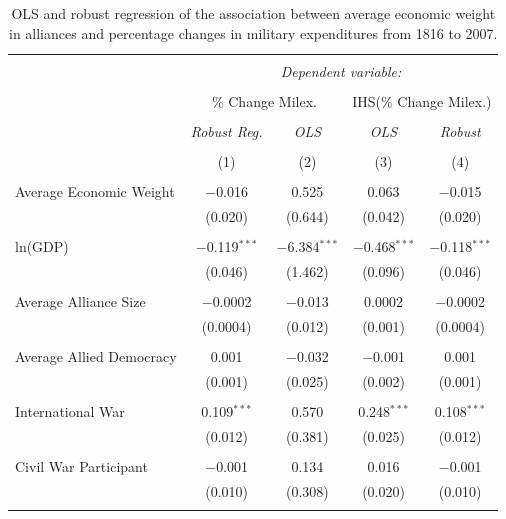 \documentclass[12pt]{article}
\begin{document}
\begin{table}[!htbp] \centering 
  \caption{OLS and robust regression of the association between average economic weight in alliances and percentage changes in military expenditures from 1816 to 2007.} 
  \label{tab:avg-weight-res} 
\begin{tabular}{@{\extracolsep{5pt}}lcccc} 
\\[-1.8ex]\hline 
\hline \\[-1.8ex] 
 & \multicolumn{4}{c}{\textit{Dependent variable:}} \\ 
\cline{2-5} 
\\[-1.8ex] & \multicolumn{2}{c}{\% Change Milex.} & \multicolumn{2}{c}{IHS(\% Change Milex.)} \\ 
\\[-1.8ex] & \textit{Robust Reg.} & \textit{OLS} & \textit{OLS} & \textit{Robust} \\ 
\\[-1.8ex] & (1) & (2) & (3) & (4)\\ 
\hline \\[-1.8ex] 
 Average Economic Weight & $-$0.016 & 0.525 & 0.063 & $-$0.015 \\ 
  & (0.020) & (0.644) & (0.042) & (0.020) \\ 
  & & & & \\ 
 ln(GDP) & $-$0.119$^{***}$ & $-$6.384$^{***}$ & $-$0.468$^{***}$ & $-$0.118$^{***}$ \\ 
  & (0.046) & (1.462) & (0.096) & (0.046) \\ 
  & & & & \\ 
 Average Alliance Size & $-$0.0002 & $-$0.013 & 0.0002 & $-$0.0002 \\ 
  & (0.0004) & (0.012) & (0.001) & (0.0004) \\ 
  & & & & \\ 
 Average Allied Democracy & 0.001 & $-$0.032 & $-$0.001 & 0.001 \\ 
  & (0.001) & (0.025) & (0.002) & (0.001) \\ 
  & & & & \\ 
 International War & 0.109$^{***}$ & 0.570 & 0.248$^{***}$ & 0.108$^{***}$ \\ 
  & (0.012) & (0.381) & (0.025) & (0.012) \\ 
  & & & & \\ 
 Civil War Participant & $-$0.001 & 0.134 & 0.016 & $-$0.001 \\ 
  & (0.010) & (0.308) & (0.020) & (0.010) \\ 
  & & & & \\ 

\end{tabular}
\end{table}
\end{document}
